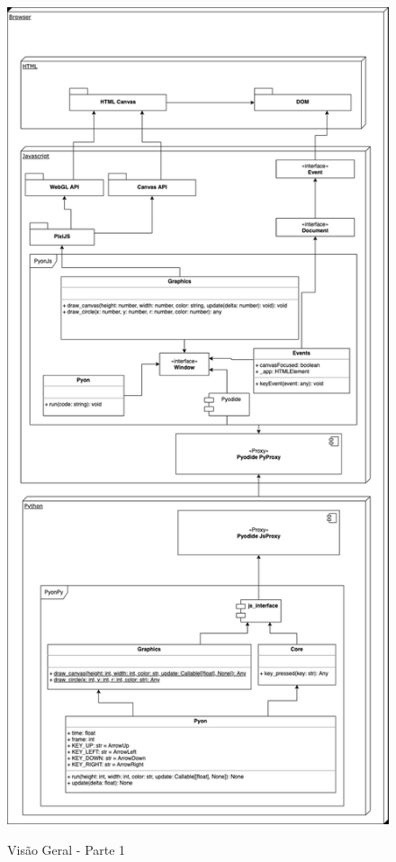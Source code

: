 \begin{apendicesenv}
\begin{figure}[!h]
    \centering
    \caption{Visão Geral - Parte 1}
    \includegraphics[trim={0 23cm 0 0},clip,keepaspectratio=true,scale=0.8]{figuras/Arquitetura.eps}
    \label{fig:arquitetura_poc_p1}
\end{figure}


\end{apendicesenv}
